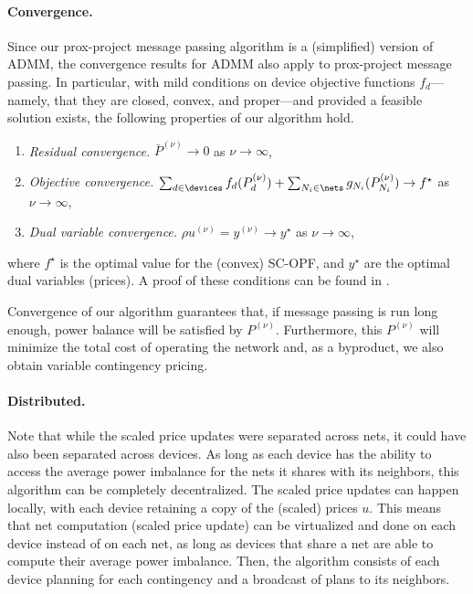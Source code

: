 \paragraph{Convergence.}
Since our prox-project message passing algorithm is a (simplified)
version of ADMM, the convergence results for ADMM also apply to
prox-project message passing. In particular, with mild conditions on
device objective functions $f_d$---namely, that they are closed, convex,
and proper---and provided a feasible solution exists, the following
properties of our algorithm hold.
\begin{enumerate}
\item \textit{Residual convergence.} $\bar P^{(\nu)} \to 0$ as $\nu \to \infty$,
\item \textit{Objective convergence.} $\sum_{d \in \devices} f_d(P_d^{(\nu)}) + \sum_{{N_i} \in \nets} g_{N_i}(P_{N_i}^{(\nu)}) \to f^\star$ as $\nu \to \infty$,
\item \textit{Dual variable convergence.} $\rho u^{(\nu)} = y^{(\nu)} \to y^\star$ as $\nu \to \infty$,
\end{enumerate}
where $f^\star$ is the optimal value for the (convex) SC-OPF, and
$y^\star$ are the optimal dual variables (prices). A proof of these
conditions can be found in \cite{BP:11}.

Convergence of our algorithm guarantees that, if message passing is run
long enough, power balance will be satisfied by $P^{(\nu)}$. Furthermore, this
$P^{(\nu)}$ will minimize the total cost of operating the network and, as a
byproduct, we also obtain variable contingency pricing.

\paragraph{Distributed.} Note that while the scaled price updates were
separated across nets, it could have also been separated across devices.
As long as each device has the ability to access the average power
imbalance for the nets it shares with its neighbors, this algorithm can
be completely decentralized. The scaled price updates can happen
locally, with each device retaining a copy of the (scaled) prices $u$.
This means that net computation (scaled price update) can be virtualized
and done on each device instead of on each net, as long as devices that
share a net are able to compute their average power imbalance. Then, the
algorithm consists of each device planning for each contingency and a
broadcast of plans to its neighbors. 

